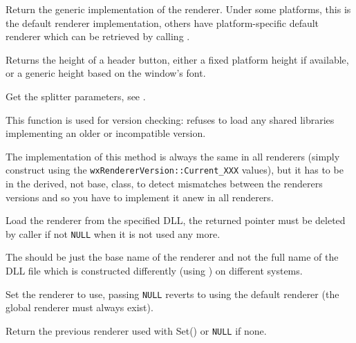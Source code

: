 \label{wxrenderernativegetgeneric}


Return the generic implementation of the renderer. Under some platforms, this
is the default renderer implementation, others have platform-specific default
renderer which can be retrieved by calling .


\label{wxrenderernativegetheaderbuttonheight}


Returns the height of a header button, either a fixed platform height if available, or a 
generic height based on the window's font.


\label{wxrenderernativegetsplitterparams}


Get the splitter parameters, see 
.


\label{wxrenderernativegetversion}


This function is used for version checking:  
refuses to load any shared libraries implementing an older or incompatible
version.

The implementation of this method is always the same in all renderers (simply
construct  using the 
{\tt wxRendererVersion::Current\_XXX} values), but it has to be in the derived,
not base, class, to detect mismatches between the renderers versions and so you
have to implement it anew in all renderers.


\label{wxrenderernativeload}


Load the renderer from the specified DLL, the returned pointer must be
deleted by caller if not {\tt NULL} when it is not used any more.

The  should be just the base name of the renderer and not the full
name of the DLL file which is constructed differently (using 
) 
on different systems.


\label{wxrenderernativeset}


Set the renderer to use, passing {\tt NULL} reverts to using the default
renderer (the global renderer must always exist).

Return the previous renderer used with Set() or {\tt NULL} if none.

